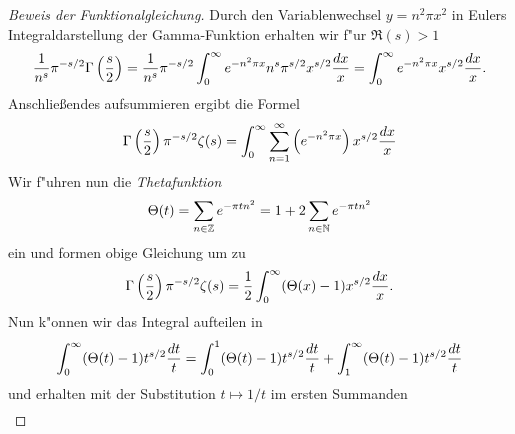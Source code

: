 	\begin{proof}[Beweis der Funktionalgleichung]
		Durch den Variablenwechsel $y=n^2\pi x^2$ in Eulers Integraldarstellung der Gamma-Funktion erhalten wir f"ur $\Re(s)>1$
		\begin{align*}
			\frac{1}{n^s} \pi^{-s/2}\Gamma\left(\frac{s}{2}\right) 
				= \frac{1}{n^s} \pi^{-s/2} \int_0^{\infty} e^{-n^2\pi x} n^s\pi^{s/2} x^{s/2} \frac{\dx}{x} 
				= \int_{0}^{\infty} e^{-n^2\pi x}x^{s/2} \frac{\dx}{x}.
		\end{align*}
		Anschließendes aufsummieren ergibt die Formel
		\begin{align*}
			\Gamma\left(\frac{s}{2}\right)\pi^{-s/2}\zeta(s) 
				= \int_{0}^{\infty} \sum_{n=1}^{\infty}\left(e^{-n^2\pi x}\right)x^{s/2} \frac{\dx}{x}
		\end{align*}
		Wir f"uhren nun die \emph{Thetafunktion}
		\begin{align*}
			\Theta(t) = \sum_{n\in \Z} e^{-\pi t n^2} = 1 + 2 \sum_{n\in\N}e^{-\pi t n^2}
		\end{align*}
		ein und formen obige Gleichung um zu
		\begin{align*}
			\Gamma\left(\frac{s}{2}\right)\pi^{-s/2}\zeta(s) 
				= \frac{1}{2}\int_{0}^{\infty}(\Theta(x)-1)x^{s/2} \frac{\dx}{x}.
		\end{align*}
		Nun k"onnen wir das Integral aufteilen in
		\begin{align*}
			\int_{0}^{\infty} (\Theta(t) - 1) t^{s/2}  \frac{\dx[t]}{t} = \int_{0}^{1} (\Theta(t) - 1) t^{s/2}  \frac{\dx[t]}{t} + \int_{1}^{\infty} (\Theta(t) - 1) t^{s/2}  \frac{\dx[t]}{t}
		\end{align*}
		und erhalten mit der Substitution $t \mapsto 1/t$ im ersten Summanden
		\begin{align*}

\end{align*}
\end{proof}
